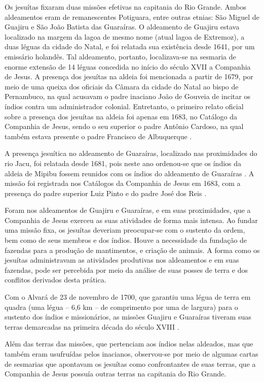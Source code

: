 Os jesuítas fixaram duas missões efetivas na capitania do Rio Grande. Ambos aldeamentos eram de remanescentes Potiguara, entre outras etnias: São Miguel de Guajiru e São João Batista das Guaraíras. O aldeamento de Guajiru estava localizado na margem da lagoa de mesmo nome (atual lagoa de Extremoz), a duas léguas da cidade do Natal, e foi relatada sua existência desde 1641, por um emissário holandês. Tal aldeamento, portanto, localizava-se na sesmaria de enorme extensão de 14 léguas concedida no início do século XVII a Companhia de Jesus. A presença dos jesuítas na aldeia foi mencionada a partir de 1679, por meio de uma queixa dos oficiais da Câmara da cidade do Natal ao bispo de Pernambuco, na qual acusavam o padre inaciano João de Gouveia de incitar os índios contra um administrador colonial. Entretanto, o primeiro relato oficial sobre a presença dos jesuítas na aldeia foi apenas em 1683, no Catálogo da Companhia de Jesus, sendo o seu superior o padre Antônio Cardoso, na qual também estava presente o padre Francisco de Albuquerque \cite[p.~170]{Lopes2003}.  

A presença jesuítica no aldeamento de Guaraíras, localizado nas proximidades do rio Jacu, foi relatada desde 1681, pois neste ano ordenou-se que os índios da aldeia de Mipibu fossem reunidos com os índios do aldeamento de Guaraíras \cite[p.~35]{Lemos1912}. A missão foi registrada nos Catálogos da Companhia de Jesus em 1683, com a presença do padre superior Luiz Pinto e do padre José dos Reis \cite[p.~172]{Lopes2003}.  

Foram nos aldeamentos de Guajiru e Guaraíras, e em suas proximidades, que a Companhia de Jesus exerceu as suas atividades de forma mais intensa. Ao fundar uma missão fixa, os jesuítas deveriam preocupar-se com o sustento da ordem, bem como de seus membros e dos índios. Houve a necessidade da fundação de fazendas para a produção de mantimentos, e criação de animais. A forma como os jesuítas administravam as atividades produtivas nos aldeamentos e em suas fazendas, pode ser percebida por meio da análise de suas posses de terra e dos conflitos derivados desta prática.  

Com o Alvará de 23 de novembro de 1700, que garantiu uma légua de terra em quadra (uma légua -- 6,6 km -- de comprimento por uma de largura) para o sustento dos índios e missionários, as missões Guajiru e Guaraíras tiveram suas terras demarcadas na primeira década do século XVIII \cites[p.~111--112]{Cascudo1984}[p.~44]{Lopes2005}.  

Além das terras das missões, que pertenciam aos índios nelas aldeados, mas que também eram usufruídas pelos inacianos, observou-se por meio de algumas cartas de sesmarias que apontavam os jesuítas como confrontantes de suas terras, que a Companhia de Jesus possuía outras terras na capitania do Rio Grande.   

